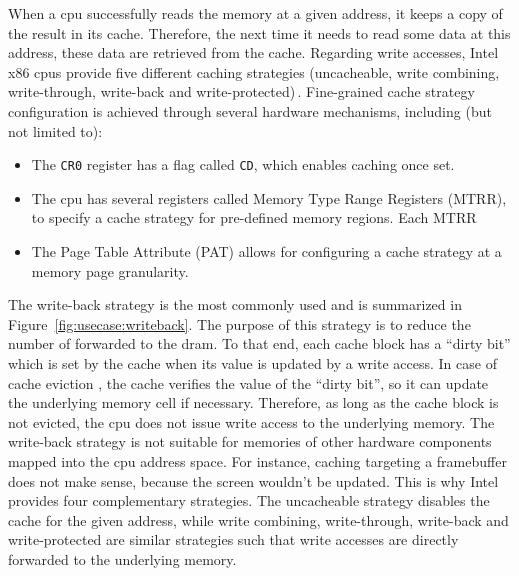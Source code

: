 When a \ac{cpu} successfully reads the memory at a given address, it keeps a
copy of the result in its cache.
%
Therefore, the next time it needs to read some data at this address, these data
are retrieved from the cache.
%
Regarding write accesses, Intel x86 \acp{cpu} provide five different caching
strategies (uncacheable, write combining, write-through, write-back and
write-protected)\,\cite[Volume 3, Chapter~11]{intel2014manual}.
%
Fine-grained cache strategy configuration is achieved through several hardware
mechanisms, including (but not limited to):
%
\begin{itemize}
\item The \texttt{CR0} register has a flag called \texttt{CD}, which enables
  caching once set.
%
\item The \ac{cpu} has several registers called Memory Type Range Registers
  (MTRR), to specify a cache strategy for pre-defined memory regions.
  Each MTRR 
\item The Page Table Attribute (PAT) allows for configuring a cache strategy at
  a memory page granularity.
\end{itemize}
%
The write-back strategy is the most commonly used and is summarized in
Figure~\ref{fig:usecase:writeback}.
%
The purpose of this strategy is to reduce the number of \IO forwarded
to the \ac{dram}.
%
To that end, each cache block  has a ``dirty bit'' which is set by the cache when its value is updated by a write access.
%
In case of cache eviction , the cache verifies the value of the ``dirty bit'', so it can update the underlying memory cell if necessary.
%
Therefore, as long as the cache block is not evicted, the \ac{cpu} does not
issue write access to the underlying memory.
%
The write-back strategy is not suitable for memories of other hardware components
mapped into the \ac{cpu} address space.
%
For instance, caching \IOs targeting a framebuffer does not make sense, because
the screen wouldn't be updated.
%
This is why Intel provides four complementary strategies.
%
The uncacheable strategy disables the cache for the given address, while write
combining, write-through, write-back and write-protected are similar strategies
such that write accesses are directly forwarded to the underlying memory. 

